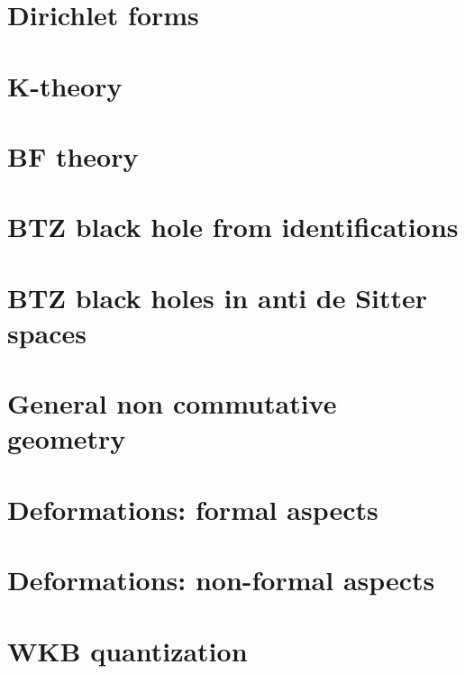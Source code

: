 \chapter{Dirichlet forms}


\chapter{K-theory}


\chapter{BF theory}


\chapter{BTZ black hole from identifications}




\chapter{BTZ black holes in anti de Sitter spaces}                  \label{ChapBHinAdS}
%
%










\chapter{General non commutative geometry}




\chapter{Deformations: formal aspects}          \label{ChapDefo}


\chapter{Deformations: non-formal aspects}


      

\chapter{WKB quantization}


